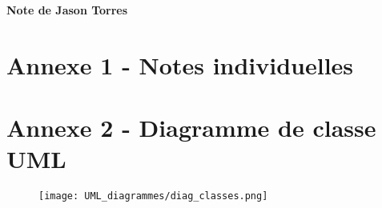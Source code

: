 \documentclass[11pt]{article}
\begin{document}
\newpage
\textbf{\Large Note de Jason Torres}



\appendix  %


\section*{Annexe 1 - Notes individuelles}



\section*{Annexe 2 - Diagramme de classe UML}

\begin{figure}[H]
    \label{UML_classes}
    \centering
    \texttt{[image: UML\_diagrammes/diag\_classes.png]}
\end{figure}



\restoregeometry


\restoregeometry
\end{document}
